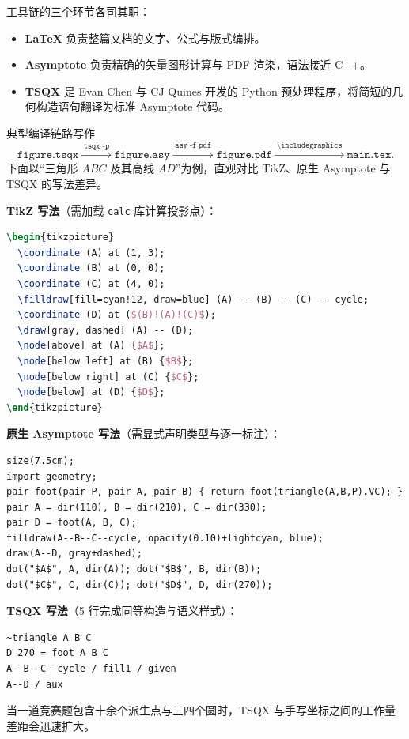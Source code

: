 \documentclass[11pt,oneside,fontset=none]{ctexbook}
\newcommand{\code}[1]{\texttt{#1}}
\begin{document}
工具链的三个环节各司其职：
\begin{itemize}
  \item \textbf{\LaTeX{}} 负责整篇文档的文字、公式与版式编排。
  \item \textbf{Asymptote} 负责精确的矢量图形计算与 PDF 渲染，语法接近 C++。
  \item \textbf{TSQX} 是 Evan Chen 与 CJ Quines 开发的 Python 预处理程序，将简短的几何构造语句翻译为标准 Asymptote 代码。
\end{itemize}

典型编译链路写作
\[
  \texttt{figure.tsqx} \xrightarrow{\;\texttt{tsqx -p}\;} \texttt{figure.asy} \xrightarrow{\;\texttt{asy -f pdf}\;} \texttt{figure.pdf} \xrightarrow{\;\texttt{\textbackslash includegraphics}\;} \texttt{main.tex}.
\]
下面以“三角形 \(ABC\) 及其高线 \(AD\)”为例，直观对比 TikZ、原生 Asymptote 与 TSQX 的写法差异。

\medskip
\noindent\textbf{TikZ 写法}（需加载 \code{calc} 库计算投影点）：
\begin{lstlisting}[language=TeX]
\begin{tikzpicture}
  \coordinate (A) at (1, 3);
  \coordinate (B) at (0, 0);
  \coordinate (C) at (4, 0);
  \filldraw[fill=cyan!12, draw=blue] (A) -- (B) -- (C) -- cycle;
  \coordinate (D) at ($(B)!(A)!(C)$);
  \draw[gray, dashed] (A) -- (D);
  \node[above] at (A) {$A$};
  \node[below left] at (B) {$B$};
  \node[below right] at (C) {$C$};
  \node[below] at (D) {$D$};
\end{tikzpicture}
\end{lstlisting}

\noindent\textbf{原生 Asymptote 写法}（需显式声明类型与逐一标注）：
\begin{lstlisting}[language={}]
size(7.5cm);
import geometry;
pair foot(pair P, pair A, pair B) { return foot(triangle(A,B,P).VC); }
pair A = dir(110), B = dir(210), C = dir(330);
pair D = foot(A, B, C);
filldraw(A--B--C--cycle, opacity(0.10)+lightcyan, blue);
draw(A--D, gray+dashed);
dot("$A$", A, dir(A)); dot("$B$", B, dir(B));
dot("$C$", C, dir(C)); dot("$D$", D, dir(270));
\end{lstlisting}

\noindent\textbf{TSQX 写法}（5 行完成同等构造与语义样式）：
\begin{lstlisting}[language={}]
~triangle A B C
D 270 = foot A B C
A--B--C--cycle / fill1 / given
A--D / aux
\end{lstlisting}

当一道竞赛题包含十余个派生点与三四个圆时，TSQX 与手写坐标之间的工作量差距会迅速扩大。
\end{document}
